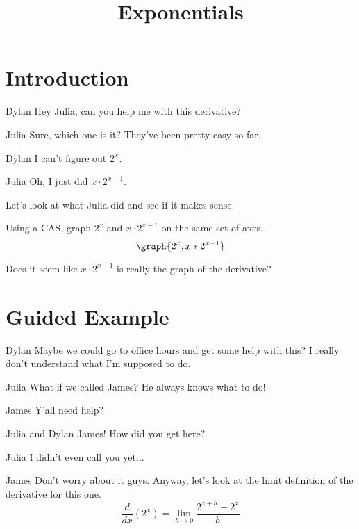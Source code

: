 \documentclass{ximera}
\title{Exponentials}
\begin{document}
\maketitle
\section{Introduction}
\begin{dialogue}
\item[Dylan] Hey Julia, can you help me with this derivative?
\item[Julia] Sure, which one is it? They've been pretty easy so far.
\item[Dylan] I can't figure out $2^x$.
\item[Julia] Oh, I just did $x \cdot 2^{x-1}$.
\end{dialogue}
Let's look at what Julia did and see if it makes sense.

\begin{question}

Using a CAS, graph $2^x$ and $x \cdot 2^{x-1}$ on the same set of axes.
\[
\graph{2^x,x*2^{x-1}}
\]


Does it seem like $x \cdot 2^{x-1}$ is really the graph of the derivative?

\begin{multipleChoice}
\end{multipleChoice}

\end{question}
\section{Guided Example}
\begin{dialogue}
\item[Dylan] Maybe we could go to office hours and get some help with this? I really don't understand what I'm supposed to do.
\item[Julia] What if we called James? He always knows what to do!
\item[James] Y'all need help?
\item[Julia and Dylan] James! How did you get here?
\item[Julia] I didn't even call you yet...
\item[James] Don't worry about it guys. Anyway, let's look at the limit definition of the derivative for this one. $$\dfrac{d}{dx}(2^x)=\lim_{h \to 0} \dfrac{2^{x+h}-2^x}{h}$$
\end{dialogue}
\end{document}
